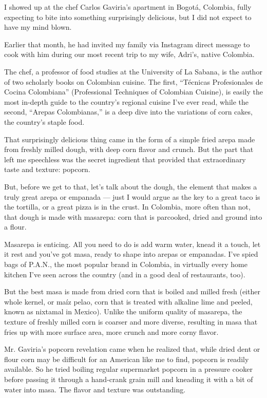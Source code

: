 I showed up at the chef Carlos Gaviria's apartment in Bogotá, Colombia,
fully expecting to bite into something surprisingly delicious, but I did
not expect to have my mind blown.

Earlier that month, he had invited my family via Instagram direct
message to cook with him during our most recent trip to my wife, Adri's,
native Colombia.

The chef, a professor of food studies at the University of La Sabana, is
the author of two scholarly books on Colombian cuisine. The first,
``Técnicas Profesionales de Cocina Colombiana'' (Professional Techniques
of Colombian Cuisine), is easily the most in-depth guide to the
country's regional cuisine I've ever read, while the second, ``Arepas
Colombianas,'' is a deep dive into the variations of corn cakes, the
country's staple food.

That surprisingly delicious thing came in the form of a simple fried
arepa made from freshly milled dough, with deep corn flavor and crunch.
But the part that left me speechless was the secret ingredient that
provided that extraordinary taste and texture: popcorn.

But, before we get to that, let's talk about the dough, the element that
makes a truly great arepa or empanada --- just I would argue as the key
to a great taco is the tortilla, or a great pizza is in the crust. In
Colombia, more often than not, that dough is made with masarepa: corn
that is parcooked, dried and ground into a flour.

Masarepa is enticing. All you need to do is add warm water, knead it a
touch, let it rest and you've got masa, ready to shape into arepas or
empanadas. I've spied bags of P.A.N., the most popular brand in
Colombia, in virtually every home kitchen I've seen across the country
(and in a good deal of restaurants, too).

But the best masa is made from dried corn that is boiled and milled
fresh (either whole kernel, or maíz pelao, corn that is treated with
alkaline lime and peeled, known as nixtamal in Mexico). Unlike the
uniform quality of masarepa, the texture of freshly milled corn is
coarser and more diverse, resulting in masa that fries up with more
surface area, more crunch and more corny flavor.

Mr. Gaviria's popcorn revelation came when he realized that, while dried
dent or flour corn may be difficult for an American like me to find,
popcorn is readily available. So he tried boiling regular supermarket
popcorn in a pressure cooker before passing it through a hand-crank
grain mill and kneading it with a bit of water into masa. The flavor and
texture was outstanding.

